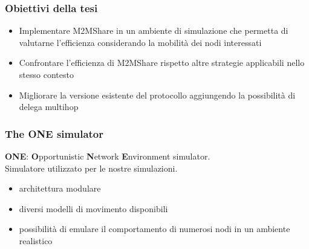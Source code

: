 \documentclass{beamer}
\begin{document}
\begin{frame}
\label{Obiettivi}
\frametitle{Obiettivi della tesi}
\begin{itemize}
\item Implementare M2MShare in un ambiente di simulazione che permetta di valutarne l'efficienza considerando la mobilità dei nodi interessati
\item Confrontare l'efficienza di M2MShare rispetto altre strategie applicabili nello stesso contesto
\item Migliorare la versione esistente del protocollo aggiungendo la possibilità di delega multihop
\end{itemize}
\end{frame}


\begin{frame}
\label{ONE}
\frametitle{The ONE simulator}
\textbf{ONE}: \textbf{O}pportunistic \textbf{N}etwork \textbf{E}nvironment simulator.\\
Simulatore utilizzato per le nostre simulazioni.
\begin{itemize}
\item architettura modulare
\item diversi modelli di movimento disponibili
\item possibilità di emulare il comportamento di numerosi nodi in un ambiente realistico
\end{itemize}


\end{frame}
\end{document}
